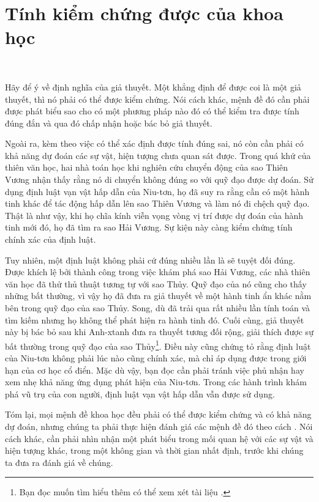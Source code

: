 \section{Tính kiểm chứng được của khoa học}

\

Hãy để ý về định nghĩa của giả thuyết. Một khẳng định để được coi là một giả thuyết, thì nó phải có thể được kiểm chứng. Nói cách khác, mệnh đề đó cần phải được phát biểu sao cho có một phương pháp nào đó có thể kiểm tra được tính đúng đắn và qua đó chấp nhận hoặc bác bỏ giả thuyết.

Ngoài ra, kèm theo việc có thể xác định được tính đúng sai, nó còn cần phải có khả năng dự đoán các sự vật, hiện tượng chưa quan sát được. Trong quá khứ của thiên văn học, hai nhà toán học khi nghiên cứu chuyển động của sao Thiên Vương nhận thấy rằng nó di chuyển không đúng so với quỹ đạo được dự đoán. Sử dụng định luật vạn vật hấp dẫn của Niu-tơn, họ đã suy ra rằng cần có một hành tinh khác để tác động hấp dẫn lên sao Thiên Vương và làm nó đi chệch quỹ đạo. Thật là như vậy, khi họ chĩa kính viễn vọng vòng vị trí được dự đoán của hành tinh mới đó, họ đã tìm ra sao Hải Vương. Sự kiện này càng kiểm chứng tính chính xác của định luật.

Tuy nhiên, một định luật không phải cứ đúng nhiều lần là sẽ tuyệt đối đúng. Được khích lệ bởi thành công trong việc khám phá sao Hải Vương, các nhà thiên văn học đã thử thủ thuật tương tự với sao Thủy. Quỹ đạo của nó cũng cho thấy những bất thường, vì vậy họ đã đưa ra giả thuyết về một hành tinh ẩn khác nằm bên trong quỹ đạo của sao Thủy. Song, dù đã trải qua rất nhiều lần tính toán và tìm kiếm nhưng họ không thể phát hiện ra hành tinh đó. Cuối cùng, giả thuyết này bị bác bỏ sau khi Anh-xtanh đưa ra thuyết tương đối rộng, giải thích được sự bất thường trong quỹ đạo của sao Thủy\footnote{Bạn đọc muốn tìm hiểu thêm có thể xem xét tài liệu \cite{baum1997search}.}. Điều này cũng chứng tỏ rằng định luật của Niu-tơn không phải lúc nào cũng chính xác, mà chỉ áp dụng được trong giới hạn của cơ học cổ điển. Mặc dù vậy, bạn đọc cần phải tránh việc phủ nhận hay xem nhẹ khả năng ứng dụng phát hiện của Niu-tơn. Trong các hành trình khám phá vũ trụ của con người, định luật vạn vật hấp dẫn vẫn được sử dụng.

Tóm lại, mọi mệnh đề khoa học đều phải có thể được kiểm chứng và có khả năng dự đoán, nhưng chúng ta phải thực hiện đánh giá các mệnh đề đó theo cách . Nói cách khác, cần phải nhìn nhận một phát biểu trong mối quan hệ với các sự vật và hiện tượng khác, trong một không gian và thời gian nhất định, trước khi chúng ta đưa ra đánh giá về chúng.